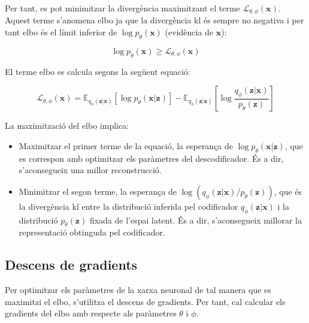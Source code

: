 \documentclass[CAT,BIB]{TFUOC}%
\begin{document}
        Per tant, es pot minimitzar la divergència maximitzant el terme $\mathcal{L}_{\theta,\phi}(\mathbf{x})$.
        Aquest terme s'anomena \gls{elbo}
        ja que la divergència \gls{kl} és sempre no negativa i
        per tant \gls{elbo} és el límit inferior de $\log p_\theta(\mathbf{x})$
        (evidència de $\mathbf{x}$):

        \begin{equation}
            \label{eq:lim_inf}
            \log p_\theta(\mathbf{x}) \ge
            \mathcal{L}_{\theta,\phi}(\mathbf{x})
        \end{equation}

        El terme \gls{elbo} es calcula segons la següent equació:

        \begin{equation}
        \label{eq:elbo}
            \mathcal{L}_{\theta,\phi}(\mathbf{x}) =
            \mathbb{E}_{q_\phi(\mathbf{z|x})}
                [ \log p_\theta(\mathbf{x|z}) ] -
            \mathbb{E}_{q_\phi(\mathbf{z|x})} \left[
                \log \frac {q_\phi(\mathbf{z|x})}
                           {p_\theta(\mathbf{z})}
            \right]
        \end{equation}

        La maximització del \gls{elbo} implica:
        \begin{itemize}
            \item Maximitzar el primer terme de la equació,
            la esperança de $\log p_\theta(\mathbf{x|z})$,
            que es correspon amb optimitzar els paràmetres del descodificador.
            És a dir, s'aconsegueix una millor reconstrucció.

            \item Minimitzar el segon terme,
            la esperança de $\log ( q_\phi(\mathbf{z|x}) / p_\theta(\mathbf{z}) )$,
            que és la divergència \gls{kl} entre
            la distribució inferida pel codificador $q_\phi(\mathbf{z|x})$
            i la distribució $p_\theta(\mathbf{z})$ fixada de l'espai latent.
            És a dir, s'aconsegueix millorar la representació obtinguda pel codificador.
        \end{itemize}

    \subsection{Descens de gradients}
    \label{s:vae_gradients}

        Per optimitzar els paràmetres de la xarxa neuronal
        de tal manera que es maximitzi el \gls{elbo},
        s'utilitza el descens de gradients.
        Per tant, cal calcular els gradients del \gls{elbo}
        amb respecte als paràmetres $\theta$ i $\phi$.
\end{document}
